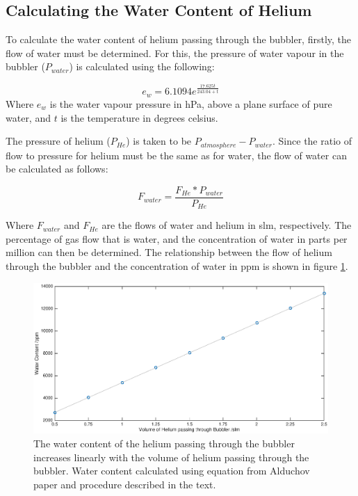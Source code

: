 \documentclass[11pt, oneside]{article}   	%
\begin{document}
\subsection{Calculating the Water Content of Helium}
\label{subsec:CalculatingWaterContent}


To calculate the water content of helium passing through the bubbler, firstly, the flow of water must be determined. For this, the pressure of water vapour in the bubbler ($P_{water}$) is calculated using the following:

\begin{equation}
	e_w = 6.1094 e^{\frac{17.625t}{243.04 + t}}
\end{equation}
Where $e_w$ is the water vapour pressure in hPa, above a plane surface of pure water, and $t$ is the temperature in degrees celsius.

The pressure of helium ($P_{He}$) is taken to be $P_{atmosphere} - P_{water}$. Since the ratio of flow to pressure for helium must be the same as for water, the flow of water can be calculated as follows:

\begin{equation}
    F_{water} = \frac{F_{He} * P_{water}}{P_{He}}
\end{equation}

Where $F_{water}$ and $F_{He}$ are the flows of water and helium in slm, respectively. The percentage of gas flow that is water, and the concentration of water in parts per million can then be determined.
The relationship between the flow of helium through the bubbler and the concentration of water in ppm is shown in figure \ref{fig:WaterContent}.

\begin{figure}
    \centering
    \includegraphics[width=\textwidth]{Figures/WaterContent.eps}
    \caption{The water content of the helium passing through the bubbler increases linearly with the volume of helium passing through the bubbler. Water content calculated using equation from Alduchov paper and procedure described in the text.}
    \label{fig:WaterContent}
\end{figure}
\end{document}
